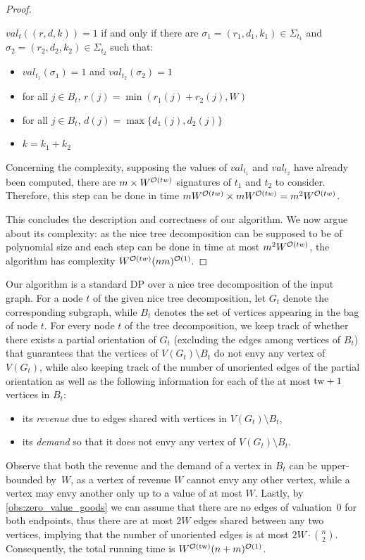 \begin{proof}
\begin{nestedproof}
    $val_t((r,d,k))=1$ if and only if there are
     $\sigma_1=(r_1,d_1,k_1)\in \Sigma_{t_1}$ and $\sigma_2=(r_2,d_2,k_2)\in \Sigma_{t_2}$ such that:
    \begin{itemize}
        \item $val_{t_1}(\sigma_1)=1$ and $val_{t_2}(\sigma_2)=1$
        \item for all $j\in B_t$, $r(j)=\min(r_1(j)+r_2(j),W)$
        \item for all $j\in B_t$, $d(j)=\max\{d_1(j),d_2(j)\}$
        \item $k=k_1+k_2$
    \end{itemize}

    \end{nestedproof}

    Concerning the complexity, supposing the values of $val_{t_1}$ and $val_{t_2}$ have already been computed, there are $m\times W^{\mathcal{O}(tw)}$ signatures of $t_1$ and $t_2$ to consider. Therefore, this step can be done in time $m W^{\mathcal{O}(tw)}\times mW^{\mathcal{O}(tw)}=m^2 W^{\mathcal{O}(tw)}$.
    \medskip

    This concludes the description and correctness of our algorithm. We now argue about its complexity: as the nice tree decomposition can be supposed to be of polynomial size and each step can be done in time at most $m^2 W^{\mathcal{O}(tw)}$, the algorithm has complexity $W^{\mathcal{O}(tw)}(nm)^{\mathcal{O}(1)}$.
\end{proof}


\begin{proofsketch}
    Our algorithm is a standard DP over a nice tree decomposition of the input graph.
    For a node $t$ of the given nice tree decomposition, let $G_t$ denote the corresponding subgraph,
    while $B_t$ denotes the set of vertices appearing in the bag of node $t$.
    For every node $t$ of the tree decomposition, we keep track of whether there exists a partial orientation of $G_t$
    (excluding the edges among vertices of $B_t$)
    that guarantees that the vertices of $V(G_t) \setminus B_t$ do not envy any vertex of $V(G_t)$,
    while also keeping track of the number of unoriented edges of the partial orientation
    as well as the following information for each of the at most $\mathrm{tw}+1$ vertices in $B_t$:
    \begin{itemize}
        \item its \emph{revenue} due to edges shared with vertices in $V(G_t) \setminus B_t$,
        \item its \emph{demand} so that it does not envy any vertex of $V(G_t) \setminus B_t$.
    \end{itemize}
    Observe that both the revenue and the demand of a vertex in $B_t$ can be upper-bounded by~$W$,
    as a vertex of revenue $W$ cannot envy any other vertex, while a vertex may envy another only up to a value of at most $W$.
    Lastly, by \cref{obs:zero_value_goods} we can assume that there are no edges of valuation~$0$ for both endpoints,
    thus there are at most $2W$ edges shared between any two vertices, implying that
    the number of unoriented edges is at most $2W \cdot \binom{n}{2}$.
    Consequently, the total running time is $W^{\mathcal{O}(\mathrm{tw})} (n+m)^{\mathcal{O}(1)}$.
\end{proofsketch}

